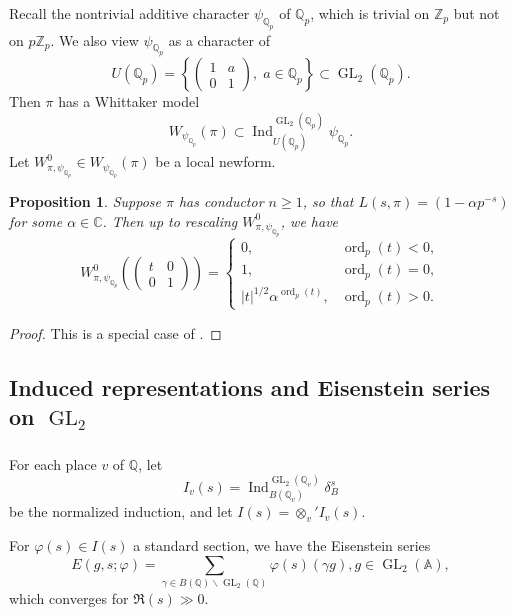 \documentclass[12pt]{amsart}
\def\bA{\mathbb{A}}
\DeclareMathOperator{\ord}{ord}
\newtheorem{prop}[thm]{Proposition}
\theoremstyle{definition}
\newcommand{\Z}{\mathbb{Z}}
\newcommand{\C}{\mathbb{C}}
\newcommand{\Q}{\mathbb{Q}}
\DeclareMathOperator{\Ind}{Ind}
\DeclareMathOperator{\GL}{GL}
\newcommand{\set}[1]{\left\{#1\right\}}
\begin{document}
\subsubsection{}
Recall the nontrivial additive character $\psi_{\Q_p}$ of $\Q_p$, which is trivial on $\Z_p$ but not on $p \Z_p$. We also view  $\psi_{\Q_p}$ as a character of $$U(\Q_p)= \set{\begin{pmatrix}    1 & a \\ 0 & 1 \end{pmatrix}, \; a \in \Q_p} \subset \GL_2(\Q_p).$$
Then $\pi$ has a Whittaker model $$W_{\psi_{\Q_p}}(\pi) \subset \Ind_{U(\Q_p)}^{\GL_2(\Q_p)} \psi_{\Q_p}.$$
Let $W_{\pi,\psi_{\Q_p}}^0\in W_{\psi_{\Q_p}}(\pi)$ be a local newform. 
\begin{prop}\label{appendix prop:whittaker newform on torus}
   Suppose $\pi$ has conductor $n \geq 1$, so that $L(s,\pi) = (1 - \alpha p^{-s})$ for some $\alpha\in \C$.  Then  up to rescaling $W_{\pi,\psi_{\Q_p}}^0$, we have 
    $$W_{\pi,\psi_{\Q_p}}^0\left(\begin{pmatrix}t & 0 \\ 0 & 1\end{pmatrix} \right)= \begin{cases} 
    0, &  \ord_p(t) < 0,\\
    1, & \ord_p (t) = 0,\\
        |t|^{1/2} \alpha ^{\ord_p (t)}, &  \ord_p(t) > 0. 
    \end{cases}$$
\end{prop}
\begin{proof}
This is a special case of \cite[Theorem 4.1]{miyauchi2014whittaker}.
\end{proof}
\subsection{Induced representations and Eisenstein series on $\GL_2$}
\subsubsection{}
For each place $v$ of $\Q$,
let \begin{equation}I_v (s) = \Ind_{B(\Q_v)}^{\GL_2(\Q_v)}\delta_B^s
\end{equation}
be the normalized induction, and let $I(s) = \otimes_v 'I_v(s)$.

For $\varphi(s) \in I(s)$ a standard section, we have the Eisenstein series
$$E(g, s;\varphi) = \sum_{\gamma\in B(\Q)\backslash\GL_2(\Q)} \varphi(s) (\gamma g), g\in \GL_2(\bA),$$ which converges for $\Re(s) \gg 0$.
\end{document}

